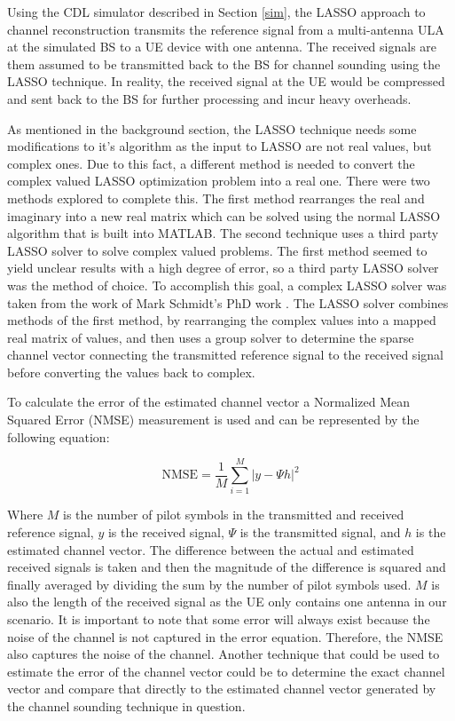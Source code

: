 Using the CDL simulator described in Section \ref{sim}, the LASSO approach to channel reconstruction transmits the reference signal from a multi-antenna ULA at the simulated BS to a UE device with one antenna. The received signals are them assumed to be transmitted back to the BS for channel sounding using the LASSO technique. In reality, the received signal at the UE would be compressed and sent back to the BS for further processing and incur heavy overheads.

As mentioned in the background section, the LASSO technique needs some modifications to it's algorithm as the input to LASSO are not real values, but complex ones. Due to this fact, a different method is needed to convert the complex valued LASSO optimization problem into a real one. There were two methods explored to complete this. The first method rearranges the real and imaginary into a new real matrix which can be solved using the normal LASSO algorithm that is built into MATLAB. The second technique uses a third party LASSO solver to solve complex valued problems. The first method seemed to yield unclear results with a high degree of error, so a third party LASSO solver was the method of choice. To accomplish this goal, a complex LASSO solver was taken from the work of Mark Schmidt's PhD work \cite{Schmidt2020}. The LASSO solver combines methods of the first method, by rearranging the complex values into a mapped real matrix of values, and then uses a group solver to determine the sparse channel vector connecting the transmitted reference signal to the received signal before converting the values back to complex.

To calculate the error of the estimated channel vector a Normalized Mean Squared Error (NMSE) measurement is used and can be represented by the following equation:

\[ \mathrm{NMSE} = \dfrac{1}{M} \sum_{i=1}^{M} | y - \Psi h |^2 \]

\noindent
Where $M$ is the number of pilot symbols in the transmitted and received reference signal, $y$ is the received signal, $\Psi$ is the transmitted signal, and $h$ is the estimated channel vector. The difference between the actual and estimated received signals is taken and then the magnitude of the difference is squared and finally averaged by dividing the sum by the number of pilot symbols used. $M$ is also the length of the received signal as the UE only contains one antenna in our scenario. It is important to note that some error will always exist because the noise of the channel is not captured in the error equation. Therefore, the NMSE also captures the noise of the channel. Another technique that could be used to estimate the error of the channel vector could be to determine the exact channel vector and compare that directly to the estimated channel vector generated by the channel sounding technique in question. 

